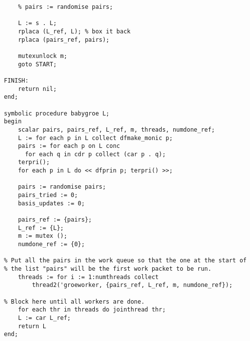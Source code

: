 \begin{code}
\begin{verbatim}
    % pairs := randomise pairs;

    L := s . L;
    rplaca (L_ref, L); % box it back
    rplaca (pairs_ref, pairs);

    mutexunlock m;
    goto START;

FINISH:
    return nil;
end;

symbolic procedure babygroe L;
begin
    scalar pairs, pairs_ref, L_ref, m, threads, numdone_ref;
    L := for each p in L collect dfmake_monic p;
    pairs := for each p on L conc
      for each q in cdr p collect (car p . q);
    terpri();
    for each p in L do << dfprin p; terpri() >>;

    pairs := randomise pairs;
    pairs_tried := 0;
    basis_updates := 0;

    pairs_ref := {pairs};
    L_ref := {L};
    m := mutex ();
    numdone_ref := {0};

% Put all the pairs in the work queue so that the one at the start of
% the list "pairs" will be the first work packet to be run.
    threads := for i := 1:numthreads collect
        thread2('groeworker, {pairs_ref, L_ref, m, numdone_ref});

% Block here until all workers are done.
    for each thr in threads do jointhread thr;
    L := car L_ref;
    return L
end;
\end{verbatim}
\end{code}